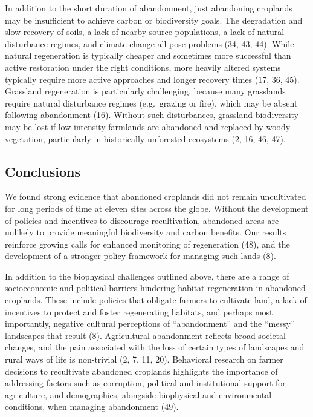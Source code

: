 \documentclass[9pt,twocolumn,twoside,]{pnas-new}
\begin{document}
In addition to the short duration of abandonment, just abandoning croplands may be insufficient to achieve carbon or biodiversity goals.
The degradation and slow recovery of soils, a lack of nearby source populations, a lack of natural disturbance regimes, and climate change all pose problems (34, 43, 44).
While natural regeneration is typically cheaper and sometimes more successful than active restoration under the right conditions, more heavily altered systems typically require more active approaches and longer recovery times (17, 36, 45).
Grassland regeneration is particularly challenging, because many grasslands require natural disturbance regimes (e.g.~grazing or fire), which may be absent following abandonment (16).
Without such disturbances, grassland biodiversity may be lost if low-intensity farmlands are abandoned and replaced by woody vegetation, particularly in historically unforested ecosystems (2, 16, 46, 47).

\hypertarget{conclusions}{%
\subsection{Conclusions}\label{conclusions}}

We found strong evidence that abandoned croplands did not remain uncultivated for long periods of time at eleven sites across the globe.
Without the development of policies and incentives to discourage recultivation, abandoned areas are unlikely to provide meaningful biodiversity and carbon benefits.
Our results reinforce growing calls for enhanced monitoring of regeneration (48), and the development of a stronger policy framework for managing such lands (8).

In addition to the biophysical challenges outlined above, there are a range of socioeconomic and political barriers hindering habitat regeneration in abandoned croplands.
These include policies that obligate farmers to cultivate land, a lack of incentives to protect and foster regenerating habitats, and perhaps most importantly, negative cultural perceptions of ``abandonment'' and the ``messy'' landscapes that result (8).
Agricultural abandonment reflects broad societal changes, and the pain associated with the loss of certain types of landscapes and rural ways of life is non-trivial (2, 7, 11, 20).
Behavioral research on farmer decisions to recultivate abandoned croplands highlights the importance of addressing factors such as corruption, political and institutional support for agriculture, and demographics, alongside biophysical and environmental conditions, when managing abandonment (49).
\end{document}

